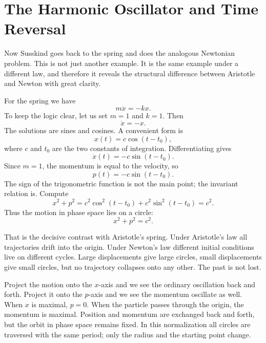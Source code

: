 \section{The Harmonic Oscillator and Time Reversal}

Now Susskind goes back to the spring and does the analogous Newtonian problem. This is not just another example. It is the same example under a different law, and therefore it reveals the structural difference between Aristotle and Newton with great clarity.

For the spring we have
\begin{equation}
m\ddot x=-kx.
\end{equation}
To keep the logic clear, let us set \(m=1\) and \(k=1\). Then
\begin{equation}
\ddot x=-x.
\end{equation}
The solutions are sines and cosines. A convenient form is
\begin{equation}
x(t)=c\cos(t-t_0),
\end{equation}
where \(c\) and \(t_0\) are the two constants of integration. Differentiating gives
\begin{equation}
\dot x(t)=-c\sin(t-t_0).
\end{equation}
Since \(m=1\), the momentum is equal to the velocity, so
\begin{equation}
p(t)=-c\sin(t-t_0).
\end{equation}
The sign of the trigonometric function is not the main point; the invariant relation is. Compute
\begin{equation}
x^2+p^2
=c^2\cos^2(t-t_0)+c^2\sin^2(t-t_0)
=c^2.
\end{equation}
Thus the motion in phase space lies on a circle:
\begin{equation}
x^2+p^2=c^2.
\end{equation}

That is the decisive contrast with Aristotle's spring. Under Aristotle's law all trajectories drift into the origin. Under Newton's law different initial conditions live on different cycles. Large displacements give large circles, small displacements give small circles, but no trajectory collapses onto any other. The past is not lost.

Project the motion onto the \(x\)-axis and we see the ordinary oscillation back and forth. Project it onto the \(p\)-axis and we see the momentum oscillate as well. When \(x\) is maximal, \(p=0\). When the particle passes through the origin, the momentum is maximal. Position and momentum are exchanged back and forth, but the orbit in phase space remains fixed. In this normalization all circles are traversed with the same period; only the radius and the starting point change.

